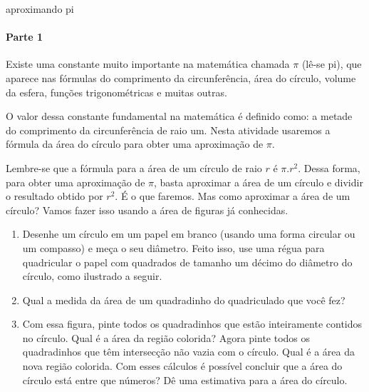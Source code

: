 \begin{task}{aproximando pi}

\paragraph{Parte 1}

Existe uma constante muito importante na matemática chamada  \(\pi\) (lê-se pi), que aparece nas fórmulas do comprimento da circunferência, área do círculo, volume da esfera, funções trigonométricas e muitas outras.

O valor dessa constante fundamental na matemática é definido como: a metade do comprimento da circunferência de raio um. Nesta atividade usaremos a fórmula da área do círculo para obter uma aproximação de \(\pi\).

Lembre-se que a fórmula para a área de um círculo de raio \(r\) é  \(\pi.r^2\). Dessa forma, para obter uma aproximação de \(\pi\), basta aproximar a área de um círculo e dividir o resultado obtido por \(r^2\). É o que faremos. Mas como aproximar a área de um círculo? Vamos fazer isso usando a área de figuras já conhecidas.
\begin{enumerate}
\item {} 
Desenhe um círculo em um papel em branco (usando uma forma circular ou um compasso) e meça o seu diâmetro. Feito isso, use uma régua para quadricular o papel com quadrados de tamanho um décimo do diâmetro do círculo, como ilustrado a seguir.

\begin{figure}[H]
\centering

\end{figure}

\item {} 
Qual a medida da área de um quadradinho do quadriculado que você fez?

\item {} 
Com essa figura, pinte todos os quadradinhos que estão inteiramente contidos no círculo. Qual é a área da região colorida? Agora pinte todos os quadradinhos que têm intersecção não vazia com o círculo. Qual é a área da nova região colorida. Com esses cálculos é possível concluir que a área do círculo está entre que números? Dê uma estimativa para a área do círculo.


\end{enumerate}
\end{task}
